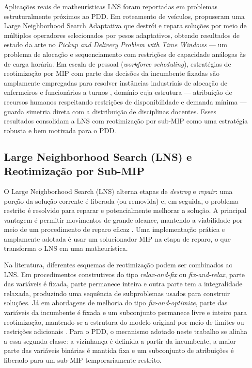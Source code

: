 Aplicações reais de matheurísticas LNS foram reportadas em problemas estruturalmente próximos ao PDD. Em roteamento de veículos,  propuseram uma Large Neighborhood Search Adaptativa que destrói e repara soluções por meio de múltiplos operadores selecionados por pesos adaptativos, obtendo resultados de estado da arte no \textit{Pickup and Delivery Problem with Time Windows} --- um problema de alocação e sequenciamento com restrições de capacidade análogas às de carga horária. Em escala de pessoal (\textit{workforce scheduling}), estratégias de reotimização por MIP com parte das decisões da incumbente fixadas são amplamente empregadas para resolver instâncias industriais de alocação de enfermeiros e funcionários a turnos \cite{maniezzo_stutzle_voss_2021}, domínio cuja estrutura --- atribuição de recursos humanos respeitando restrições de disponibilidade e demanda mínima --- guarda simetria direta com a distribuição de disciplinas docentes. Esses resultados consolidam a LNS com reotimização por sub-MIP como uma estratégia robusta e bem motivada para o PDD.

\subsection{Large Neighborhood Search (LNS) e Reotimização por Sub-MIP}

O Large Neighborhood Search (LNS) alterna etapas de \textit{destroy} e \textit{repair}: uma porção da solução corrente é liberada (ou removida) e, em seguida, o problema restrito é resolvido para reparar e potencialmente melhorar a solução. A principal vantagem é permitir movimentos de grande alcance, mantendo a viabilidade por meio de um procedimento de reparo eficaz \cite{ahuja_ergun_orlin_punnen_2002,pisinger_ropke_2010}. Uma implementação prática e amplamente adotada é usar um solucionador MIP na etapa de reparo, o que transforma o LNS em uma matheurística.

Na literatura, diferentes esquemas de reotimização podem ser combinados ao LNS. Em procedimentos construtivos do tipo \textit{relax-and-fix} ou \textit{fix-and-relax}, parte das variáveis é fixada, parte permanece inteira e outra parte tem a integralidade relaxada, produzindo uma sequência de subproblemas usados para construir soluções. Já em abordagens de melhoria do tipo \textit{fix-and-optimize}, parte das variáveis da incumbente é fixada e um subconjunto permanece livre e inteiro para reotimização, mantendo-se a estrutura do modelo original por meio de limites ou restrições adicionais \cite{pisinger_ropke_2010}. Para o PDD, o mecanismo adotado neste trabalho se alinha a essa segunda classe: a vizinhança é definida a partir da incumbente, a maior parte das variáveis binárias é mantida fixa e um subconjunto de atribuições é liberado para um sub-MIP temporariamente restrito.

